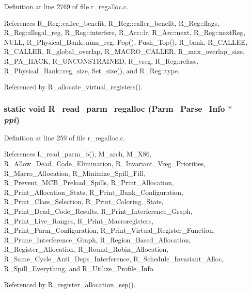 Definition at line 2769 of file r\_\-regalloc.c.

References R\_\-Reg::callee\_\-benefit, R\_\-Reg::caller\_\-benefit, R\_\-Reg::flags, R\_\-Reg::illegal\_\-reg, R\_\-Reg::interfere, R\_\-Arc::lr, R\_\-Arc::next, R\_\-Reg::next\-Reg, NULL, R\_\-Physical\_\-Bank::num\_\-reg, Pop(), Push\_\-Top(), R\_\-bank, R\_\-CALLEE, R\_\-CALLER, R\_\-global\_\-overlap, R\_\-MACRO\_\-CALLER, R\_\-max\_\-overlap\_\-size, R\_\-PA\_\-HACK, R\_\-UNCONSTRAINED, R\_\-vreg, R\_\-Reg::rclass, R\_\-Physical\_\-Bank::reg\_\-size, Set\_\-size(), and R\_\-Reg::type.

Referenced by R\_\-allocate\_\-virtual\_\-registers().
\subsubsection{\setlength{\rightskip}{0pt plus 5cm}static void R\_\-read\_\-parm\_\-regalloc (\bf{Parm\_\-Parse\_\-Info} $\ast$ {\em ppi})\hspace{0.3cm}{\tt  [static]}}\label{r__regalloc_8c_dead82e841abac70aeddb81168a1f4b1}




Definition at line 259 of file r\_\-regalloc.c.

References L\_\-read\_\-parm\_\-b(), M\_\-arch, M\_\-X86, R\_\-Allow\_\-Dead\_\-Code\_\-Elimination, R\_\-Invariant\_\-Vreg\_\-Priorities, R\_\-Macro\_\-Allocation, R\_\-Minimize\_\-Spill\_\-Fill, R\_\-Prevent\_\-MCB\_\-Preload\_\-Spills, R\_\-Print\_\-Allocation, R\_\-Print\_\-Allocation\_\-Stats, R\_\-Print\_\-Bank\_\-Configuration, R\_\-Print\_\-Class\_\-Selection, R\_\-Print\_\-Coloring\_\-Stats, R\_\-Print\_\-Dead\_\-Code\_\-Results, R\_\-Print\_\-Interference\_\-Graph, R\_\-Print\_\-Live\_\-Ranges, R\_\-Print\_\-Macroregisters, R\_\-Print\_\-Parm\_\-Configuration, R\_\-Print\_\-Virtual\_\-Register\_\-Function, R\_\-Prune\_\-Interference\_\-Graph, R\_\-Region\_\-Based\_\-Allocation, R\_\-Register\_\-Allocation, R\_\-Round\_\-Robin\_\-Allocation, R\_\-Same\_\-Cycle\_\-Anti\_\-Deps\_\-Interference, R\_\-Schedule\_\-Invariant\_\-Alloc, R\_\-Spill\_\-Everything, and R\_\-Utilize\_\-Profile\_\-Info.

Referenced by R\_\-register\_\-allocation\_\-sep().
